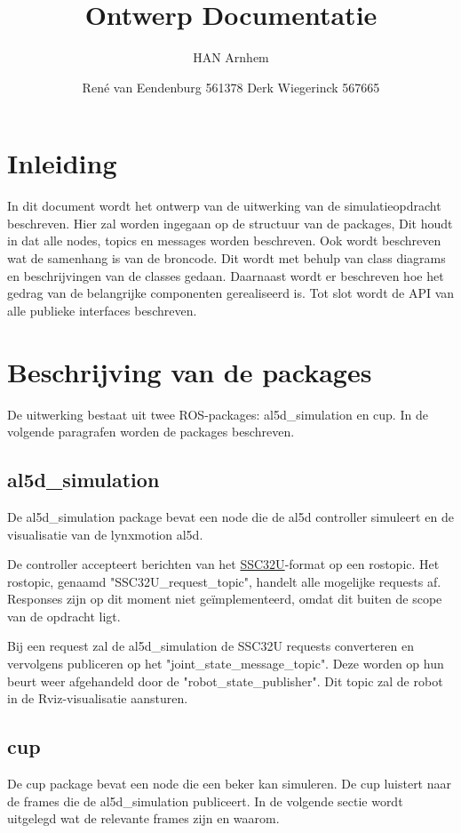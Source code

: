 \documentclass[11pt,titlepage]{article}
\author{René van Eendenburg 561378 \cr Derk Wiegerinck 567665}
\title{Ontwerp Documentatie}
\subtitle{HAN Arnhem}{Versie 1}{WOR-World}
\begin{document}
\maketitle



\tableofcontents
\clearpage


\section{Inleiding}
In dit document wordt het ontwerp van de uitwerking van de simulatieopdracht beschreven. Hier zal worden ingegaan op de structuur van de packages, Dit houdt in dat alle nodes, topics en messages worden beschreven. Ook wordt beschreven wat de samenhang is van de broncode. Dit wordt met behulp van class diagrams en beschrijvingen van de classes gedaan. Daarnaast wordt er beschreven hoe het gedrag van de belangrijke componenten gerealiseerd is. Tot slot wordt de API van alle publieke interfaces beschreven.

\section{Beschrijving van de packages}
De uitwerking bestaat uit twee ROS-packages: al5d\_simulation en cup. In de volgende paragrafen worden de packages beschreven.

\subsection{al5d\_simulation}
De al5d\_simulation package bevat een node die de al5d controller simuleert en de visualisatie van de lynxmotion al5d.

De controller accepteert berichten van het \href{https://www.robotshop.com/media/files/pdf2/lynxmotion_ssc-32u_usb_user_guide.pdf
}{SSC32U}-format op een rostopic. Het rostopic, genaamd "SSC32U\_request\_topic", handelt alle mogelijke requests af. Responses zijn op dit moment niet geïmplementeerd, omdat dit buiten de scope van de opdracht ligt.

Bij een request zal de al5d\_simulation de SSC32U requests converteren en vervolgens publiceren op het "joint\_state\_message\_topic". Deze worden op hun beurt weer afgehandeld door de "robot\_state\_publisher". Dit topic zal de robot in de Rviz-visualisatie aansturen.

\subsection{cup}
De cup package bevat een node die een beker kan simuleren. De cup luistert naar de frames die de al5d\_simulation publiceert. In de volgende sectie wordt uitgelegd wat de relevante frames zijn en waarom.
\end{document}
